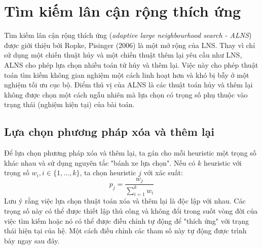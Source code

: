 \section{Tìm kiếm lân cận rộng thích ứng}
Tìm kiếm lân cận rộng thích ứng (\textit{adaptive large neighbourhood search - ALNS}) được giới thiệu bởi Ropke, Pisinger (2006) \cite{ropke2006adaptive} là một mở rộng của LNS. Thay vì chỉ sử dụng một chiến thuật hủy và một chiến thuật thêm lại yêu cầu như LNS, ALNS cho phép lựa chọn nhiều toán tử hủy và thêm lại. Việc này cho phép thuật toán tìm kiếm không gian nghiệm một cách linh hoạt hơn và khó bị bẫy ở một nghiệm tối ưu cục bộ. Điểm thú vị của ALNS là các thuật toán hủy và thêm lại không được chọn một cách ngẫu nhiên mà lựa chọn có trọng số phụ thuộc vào trạng thái (nghiệm hiện tại) của bài toán.

\subsection{Lựa chọn phương pháp xóa và thêm lại}
Để lựa chọn phương pháp xóa và thêm lại, ta gán cho mỗi heuristic một trọng số khác nhau và sử dụng nguyên tắc "bánh xe lựa chọn". Nếu có $k$ heuristic với trọng số $w_i, i \in \{1,...,k\}$, ta chọn heuristic $j$ với xác suất:
\begin{equation}
	\label{eq:select}
	p_j = \frac{w_j}{\sum_{i=1}^k w_i}
\end{equation}
Lưu ý rằng việc lựa chọn thuật toán xóa và thêm lại là độc lập với nhau. Các trọng số này có thể được thiết lập thủ công và không đổi trong suốt vòng đời của việc tìm kiếm hoặc nó có thể được điều chỉnh tự động để "thích ứng" với trạng thái hiện tại của hệ. Một cách điều chỉnh các tham số này tự động được trình bày ngay sau đây.

